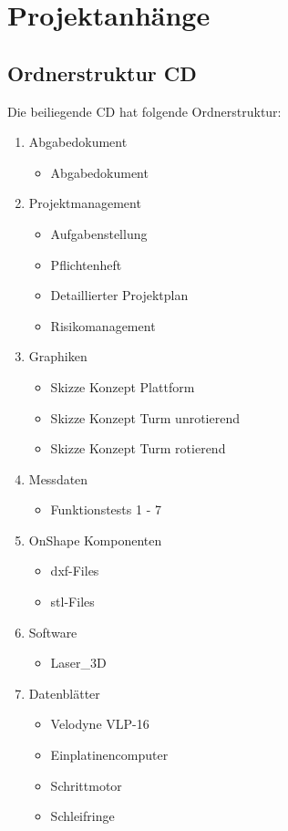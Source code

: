 \appendix

\chapter{Projektanhänge}
\label{Anhang}
\section{Ordnerstruktur CD}

Die beiliegende CD hat folgende Ordnerstruktur:

\begin{enumerate}
	\item Abgabedokument
	\begin{itemize}
		\item Abgabedokument
	\end{itemize}
	\item Projektmanagement
	\begin{itemize}
		\item Aufgabenstellung
		\item Pflichtenheft
		\item Detaillierter Projektplan
		\item Risikomanagement
	\end{itemize}
	\item Graphiken
	\begin{itemize}
		\item Skizze Konzept Plattform
		\item Skizze Konzept Turm unrotierend
		\item Skizze Konzept Turm rotierend
	\end{itemize}
	\item Messdaten
	\begin{itemize}
		\item Funktionstests 1 - 7
	\end{itemize}
	\item OnShape Komponenten
	\begin{itemize}
		\item dxf-Files
		\item stl-Files
	\end{itemize}
	\item Software
	\begin{itemize}
		\item Laser\_3D
	\end{itemize}
	\item Datenblätter
	\begin{itemize}
		\item Velodyne VLP-16
		\item Einplatinencomputer
		\item Schrittmotor
		\item Schleifringe
	\end{itemize}
\end{enumerate}

\newpage




